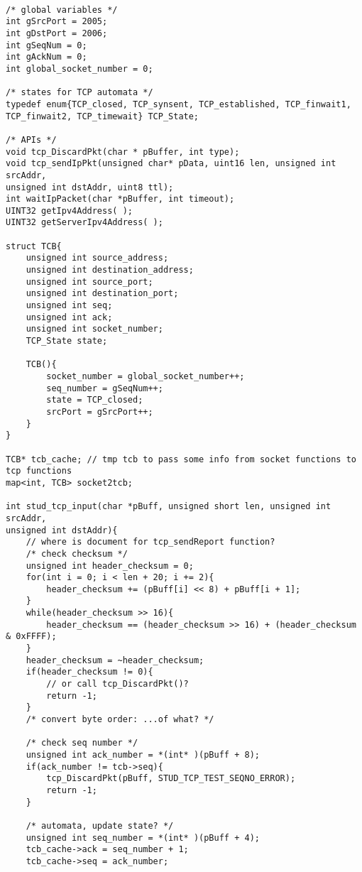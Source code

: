 \documentclass{article}
\begin{document}

\lstset{breaklines}
\lstset{extendedchars=false}

\begin{lstlisting}

/* global variables */
int gSrcPort = 2005;
int gDstPort = 2006;
int gSeqNum = 0;
int gAckNum = 0;
int global_socket_number = 0;

/* states for TCP automata */
typedef enum{TCP_closed, TCP_synsent, TCP_established, TCP_finwait1, TCP_finwait2, TCP_timewait} TCP_State;

/* APIs */
void tcp_DiscardPkt(char * pBuffer, int type);
void tcp_sendIpPkt(unsigned char* pData, uint16 len, unsigned int srcAddr,
unsigned int dstAddr, uint8 ttl);
int waitIpPacket(char *pBuffer, int timeout);
UINT32 getIpv4Address( );
UINT32 getServerIpv4Address( );

struct TCB{
    unsigned int source_address;
    unsigned int destination_address;
    unsigned int source_port;
    unsigned int destination_port;
    unsigned int seq;
    unsigned int ack;
    unsigned int socket_number;
    TCP_State state;

    TCB(){
        socket_number = global_socket_number++;
        seq_number = gSeqNum++;
        state = TCP_closed;
        srcPort = gSrcPort++;
    }
}

TCB* tcb_cache; // tmp tcb to pass some info from socket functions to tcp functions
map<int, TCB> socket2tcb;

int stud_tcp_input(char *pBuff, unsigned short len, unsigned int srcAddr,
unsigned int dstAddr){
    // where is document for tcp_sendReport function?
    /* check checksum */
    unsigned int header_checksum = 0;
    for(int i = 0; i < len + 20; i += 2){
        header_checksum += (pBuff[i] << 8) + pBuff[i + 1];
    }
    while(header_checksum >> 16){
        header_checksum == (header_checksum >> 16) + (header_checksum & 0xFFFF);
    }
    header_checksum = ~header_checksum;
    if(header_checksum != 0){
        // or call tcp_DiscardPkt()?
        return -1;
    }
    /* convert byte order: ...of what? */

    /* check seq number */
    unsigned int ack_number = *(int* )(pBuff + 8);
    if(ack_number != tcb->seq){
        tcp_DiscardPkt(pBuff, STUD_TCP_TEST_SEQNO_ERROR);
        return -1;
    }

    /* automata, update state? */
    unsigned int seq_number = *(int* )(pBuff + 4);
    tcb_cache->ack = seq_number + 1;
    tcb_cache->seq = ack_number;


\end{lstlisting}
\end{document}
